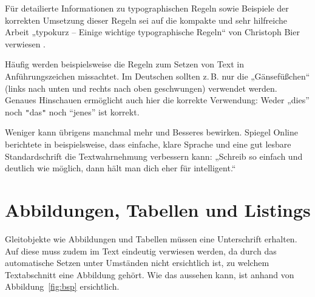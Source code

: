 \documentclass[
    fontsize=12pt,
    headings=small,
    parskip=half,           %
    bibliography=totoc,
    numbers=noenddot,       %
    open=any,               %
    ]{scrreprt}
\begin{document}
Für detailierte Informationen zu typographischen Regeln sowie Beispiele der korrekten Umsetzung dieser Regeln sei auf die kompakte und sehr hilfreiche Arbeit „typokurz -- Einige wichtige typographische Regeln“ von Christoph Bier verwiesen \cite{Bier2009}.

Häufig werden beispielsweise die Regeln zum Setzen von Text in Anführungszeichen missachtet. Im Deutschen sollten z.\,B. nur die „Gänsefüßchen“ (links nach unten und rechts nach oben geschwungen) verwendet werden. Genaues Hinschauen ermöglicht auch hier die korrekte Verwendung: Weder „dies” noch {\verb#"#}das{\verb#"#} noch “jenes” ist korrekt.

Weniger kann übrigens manchmal mehr und Besseres bewirken. Spiegel Online berichtete in \cite{textwahrnehmung} beispielsweise, dass einfache, klare Sprache und eine gut lesbare Standardschrift die Textwahrnehmung verbessern kann: „Schreib so einfach und deutlich wie möglich, dann hält man dich eher für intelligent.“

\section{Abbildungen, Tabellen und Listings}

Gleitobjekte wie Abbildungen und Tabellen müssen eine Unterschrift erhalten. Auf diese muss zudem im Text eindeutig verwiesen werden, da durch das automatische Setzen unter Umständen nicht ersichtlich ist, zu welchem Textabschnitt eine Abbildung gehört. Wie das aussehen kann, ist anhand von Abbildung~\ref{fig:bsp} ersichtlich.
\end{document}
